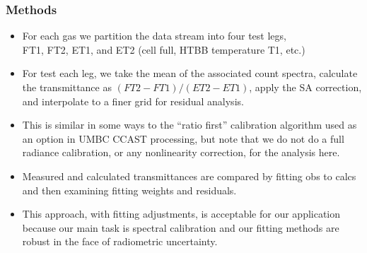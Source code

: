 \documentclass[10pt]{beamer}
\begin{document}
\begin{frame}
\frametitle{Methods}
\begin{itemize}

  \item For each gas we partition the data stream into four test
    legs, \\ FT1, FT2, ET1, and ET2 (cell full, HTBB temperature T1,
    etc.)

  \item For test each leg, we take the mean of the associated count
    spectra, calculate the transmittance as $(FT2 - FT1) / (ET2 -
    ET1)$, apply the SA correction, and interpolate to a finer grid
    for residual analysis.
    
  \item This is similar in some ways to the ``ratio first''
    calibration algorithm used as an option in UMBC CCAST
    processing, but note that we do not do a full radiance
    calibration, or any nonlinearity correction, for the analysis
    here.

  \item Measured and calculated transmittances are compared by
    fitting obs to calcs and then examining fitting weights and
    residuals.

  \item This approach, with fitting adjustments, is acceptable for
    our application because our main task is spectral calibration
    and our fitting methods are robust in the face of radiometric
    uncertainty.

\end{itemize}
\end{frame}
\end{document}
